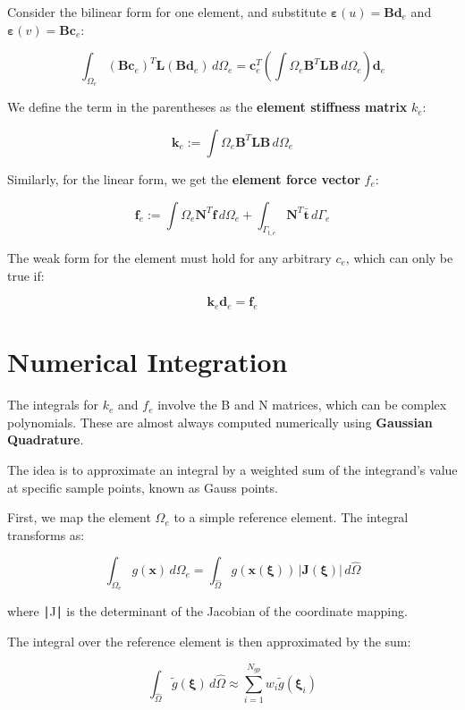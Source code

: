 \documentclass[
  11pt,
  a4paper,
]{scrbook}
\begin{document}
Consider the bilinear form for one element, and substitute
\(\boldsymbol{\varepsilon}(u)=\boldsymbol{B}\boldsymbol{d}_e\) and
\(\boldsymbol{\varepsilon}(v)=\boldsymbol{B}\boldsymbol{c}_e\):

\[ \int_{\Omega_e} (\mathbf{B}\mathbf{c}_e)^T \mathbf{L} (\mathbf{B}\mathbf{d}_e) \, d\Omega_e = \mathbf{c}_e^T \left( \int{\Omega_e} \mathbf{B}^T \mathbf{L} \mathbf{B} \, d\Omega_e \right) \mathbf{d}_e \]

We define the term in the parentheses as the \textbf{element stiffness
matrix} \(k_e\):

\[ \mathbf{k}_e := \int{\Omega_e} \mathbf{B}^T \mathbf{L} \mathbf{B} \, d\Omega_e \]

Similarly, for the linear form, we get the \textbf{element force vector}
\(f_e\):

\[ \mathbf{f}_e := \int{\Omega_e} \mathbf{N}^T \mathbf{f} \, d\Omega_e + \int_{\Gamma_{t,e}} \mathbf{N}^T \bar{\mathbf{t}} \, d\Gamma_e \]

The weak form for the element must hold for any arbitrary \(c_e\), which
can only be true if:

\[ \mathbf{k}_e \mathbf{d}_e = \mathbf{f}_e \]

\section{Numerical Integration}\label{numerical-integration}

The integrals for \(k_e\) and \(f_e\) involve the B and N matrices,
which can be complex polynomials. These are almost always computed
numerically using \textbf{Gaussian Quadrature}.

The idea is to approximate an integral by a weighted sum of the
integrand's value at specific sample points, known as Gauss points.

First, we map the element \(\Omega_e\) to a simple reference element.
The integral transforms as:

\[\int_{\Omega_e} g(\mathbf{x}) \, d\Omega_e = \int_{\hat{\Omega}} g(\mathbf{x}(\boldsymbol{\xi})) \, |\mathbf{J}(\boldsymbol{\xi})| \, d\hat{\Omega}\]

where ∣J∣ is the determinant of the Jacobian of the coordinate mapping.

The integral over the reference element is then approximated by the sum:

\[\int_{\hat{\Omega}} \tilde{g}(\boldsymbol{\xi}) \, d\hat{\Omega} \approx \sum_{i=1}^{N_{gp}} w_i \tilde{g}(\boldsymbol{\xi}_i)\]
\end{document}
